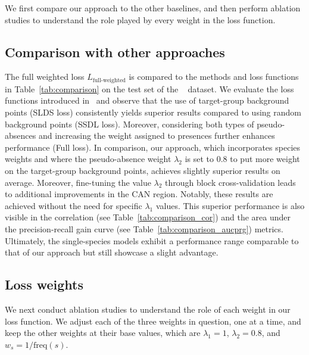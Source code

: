 \documentclass[3p,preprint,12pt]{elsarticle}
\begin{document}
We first compare our approach to the other baselines, and then perform ablation studies to understand the role played by every weight in the loss function.

\subsection{Comparison with other approaches}



The full weighted loss $L_{\text{full-weighted}}$ is compared to the methods and loss functions in Table~\ref{tab:comparison} on the test set of the ~\cite{elith2020presence} dataset. We evaluate the loss functions introduced in~\cite{cole2023spatial} and observe that the use of target-group background points (SLDS loss) consistently yields superior results compared to using random background points (SSDL loss). Moreover, considering both types of pseudo-absences and increasing the weight assigned to presences further enhances performance (Full loss). In comparison, our approach, which incorporates species weights and where the pseudo-absence weight $\lambda_2$ is set to $0.8$ to put more weight on the target-group background points, achieves slightly superior results on average. Moreover, fine-tuning the value $\lambda_2$ through block cross-validation leads to additional improvements in the CAN region. Notably, these results are achieved without the need for specific $\lambda_1$ values. This superior performance is also visible in the correlation (see Table~\ref{tab:comparison_cor}) and the area under the precision-recall gain curve (see Table~\ref{tab:comparison_aucprg}) metrics.
Ultimately, the single-species models exhibit a performance range comparable to that of our approach but still showcase a slight advantage.%

\subsection{Loss weights}

We next conduct ablation studies to understand the role of each weight in our loss function. We adjust each of the three weights in question, one at a time, and keep the other weights at their base values, which are $\lambda_1 = 1$, $\lambda_2 = 0.8$, and $w_s = 1/\text{freq}(s)$.


\end{document}
